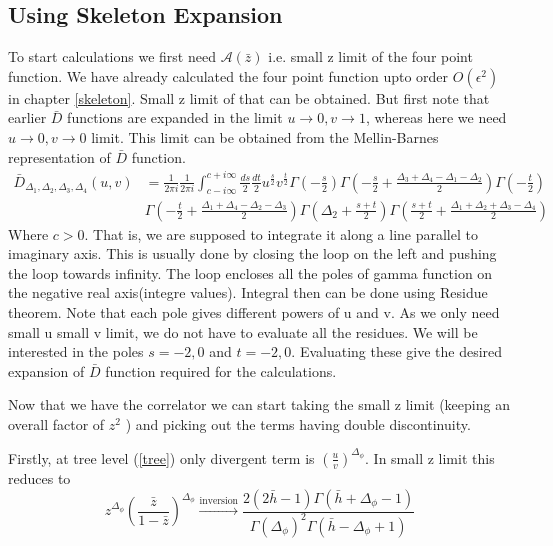 \documentclass[12pt,a4paper,oneside]{book}
\theoremstyle{definition}
\begin{document}
        \subsection{Using Skeleton Expansion}
            To start calculations we first need $\mathcal{A}(\bar{z})$ i.e. small z limit of the four point function. We have already calculated the four point function upto order $O(\epsilon^2)$ in chapter \ref{skeleton}. Small z limit of that can be obtained. But first note that earlier $\bar{D}$ functions are expanded in the limit $u\to0,v\to1$, whereas here we need $u\to0,v\to0$ limit. This limit can be obtained from the Mellin-Barnes representation \cite{mellinbarnes} of $\bar{D}$ function. 
            \begin{align}
                \bar{D}_{\Delta_1,\Delta_2,\Delta_3,\Delta_4}(u,v) &= \frac{1}{2\pi i}\frac{1}{2\pi i}\int_{c-i\infty}^{c+i\infty} \frac{ds}{2}\frac{dt}{2}u^{\tfrac{s}{2}}v^{\tfrac{t}{2}}\Gamma(-\tfrac{s}{2})\Gamma(-\tfrac{s}{2}+\tfrac{\Delta_3+\Delta_4-\Delta_1-\Delta_2}{2})\Gamma(-\tfrac{t}{2})\nonumber\\ &\Gamma(-\tfrac{t}{2}+\tfrac{\Delta_1+\Delta_4-\Delta_2-\Delta_3}{2})\Gamma(\Delta_2+\tfrac{s+t}{2})\Gamma(\tfrac{s+t}{2}+\tfrac{\Delta_1+\Delta_2+\Delta_3-\Delta_4}{2})
            \end{align}
            Where $c>0$. That is, we are supposed to integrate it along a line parallel to imaginary axis. This is usually done by closing the loop on the left and pushing the loop towards infinity. The loop encloses all the poles of gamma function on the negative real axis(integre values). Integral then can be done using Residue theorem. Note that each pole gives different powers of u and v. As we only need small u small v limit, we do not have to evaluate all the residues. We will be interested in the poles $s=-2,0$ and $t=-2,0$. Evaluating these give the desired expansion of $\bar{D}$ function required for the calculations.\par 
            Now that we have the correlator we can start taking the small z limit (keeping an overall factor of $z^2$ ) and picking out the terms having double discontinuity.\par
            Firstly, at tree level (\ref{tree}) only divergent term is $\left(\frac{u}{v}\right)^{\Delta_{\phi}}$. In small z limit this reduces to 
            \begin{equation}
                z^{\Delta_{\phi}}\left(\frac{\bar{z}}{1-\bar{z}} \right)^{\Delta_{\phi}} \xrightarrow{\text{inversion}} \frac{2(2\bar{h}-1)\Gamma(\bar{h}+\Delta_{\phi}-1)}{\Gamma(\Delta_{\phi})^2\Gamma(\bar{h}-\Delta_{\phi}+1)}
            \end{equation}
\end{document}
